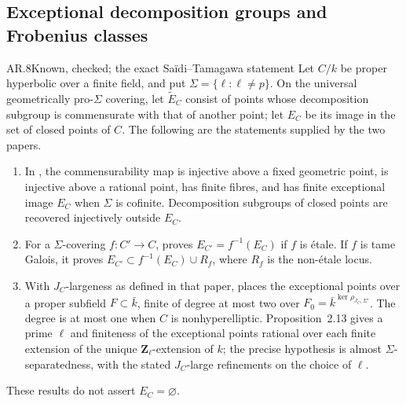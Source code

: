 \subsection{Exceptional decomposition groups and Frobenius classes}

\begin{claim}{AR.8}{Known, checked; the exact Sa\"idi--Tamagawa statement}
Let $C/k$ be proper hyperbolic over a finite field, and put
$\Sigma=\{\ell:\ell\ne p\}$.  On the universal geometrically
pro-$\Sigma$ covering, let $\widetilde E_C$ consist of points whose
decomposition subgroup is commensurate with that of another point;
let $E_C$ be its image in the set of closed points of $C$.
The following are the statements supplied by the two papers.
\begin{enumerate}
\item In \cite[Definition~1.5, Lemma~1.7, Proposition~1.8(iii)--(vii),
Definition~1.10 and Corollary~1.11]{AR_ST2009}, the commensurability
map is injective above a fixed geometric point, is injective above a
rational point, has finite fibres, and has finite exceptional image
$E_C$ when $\Sigma$ is cofinite.  Decomposition subgroups of closed
points are recovered injectively outside $E_C$.
\item For a $\Sigma$-covering $f:C'\to C$,
\cite[Proposition~2.11]{AR_ST2017} proves
$E_{C'}=f^{-1}(E_C)$ if $f$ is \'etale.  If $f$ is tame Galois,
it proves $E_{C'}\subset f^{-1}(E_C)\cup R_f$, where $R_f$ is the
non-\'etale locus.
\item With $J_C$-largeness as defined in that paper,
\cite[Proposition~2.12]{AR_ST2017} places the exceptional points over
a proper subfield $F\subset\bar k$, finite of degree at most two over
$F_0=\bar k^{\ker\rho_{J_C,\Sigma'}}$.  The degree is at most one
when $C$ is nonhyperelliptic.  Proposition~2.13 gives a prime $\ell$
and finiteness of the exceptional points rational over each finite
extension of the unique $\mathbf Z_\ell$-extension of $k$; the
precise hypothesis is almost $\Sigma$-separatedness, with the stated
$J_C$-large refinements on the choice of $\ell$.
\end{enumerate}
These results do not assert $E_C=\varnothing$.
\end{claim}



